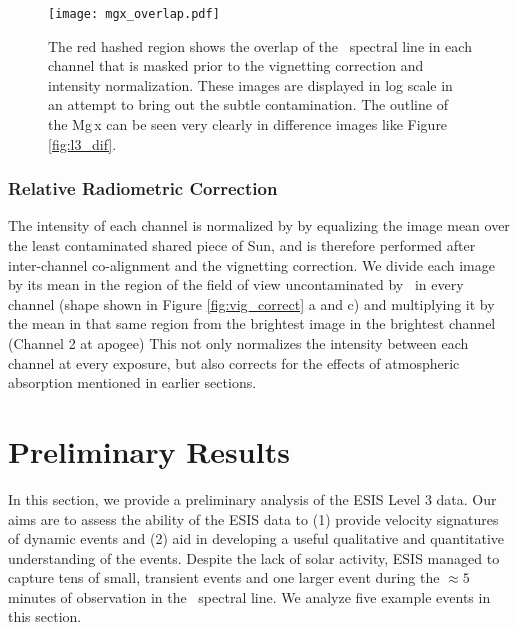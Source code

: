   
        
        \begin{figure}
        	\centering
        	\texttt{[image: mgx\_overlap.pdf]}
        	\caption{The red hashed region shows the overlap of the \mgxbright \ spectral line in each channel that is masked prior to the vignetting correction and intensity normalization. These images are displayed in log scale in an attempt to bring out the subtle contamination.  The outline of the Mg\,{\sc x} can be seen very clearly in difference images like Figure \ref{fig:l3_dif}. }

        	\label{fig:mgx_overlap}
        \end{figure}
        
        

        
    \subsubsection{Relative Radiometric Correction }
        The intensity of each channel is normalized by by equalizing the image mean over the least contaminated shared piece of Sun, and is therefore performed after inter-channel co-alignment and the vignetting correction.
        We divide each image by its mean in the region of the field of view uncontaminated by \mgxbright \ in every channel (shape shown in Figure \ref{fig:vig_correct} a and c) and multiplying it by the mean in that same region from the brightest image in the brightest channel (Channel 2 at apogee)
        This not only normalizes the intensity between each channel at every exposure, but also corrects for the effects of atmospheric absorption mentioned in earlier sections. 


\section{Preliminary Results}
 
	   In this section, we provide a preliminary analysis of the ESIS Level 3 data. Our aims are to assess the ability of the ESIS data to (1) provide velocity signatures of dynamic events and (2) aid in developing a useful qualitative and quantitative understanding of the events.
	   Despite the lack of solar activity, ESIS managed to capture tens of small, transient events and one larger event during the $\approx 5$ minutes of observation in the \ov \ spectral line.  
	   We analyze five example events in this section.  
	   
